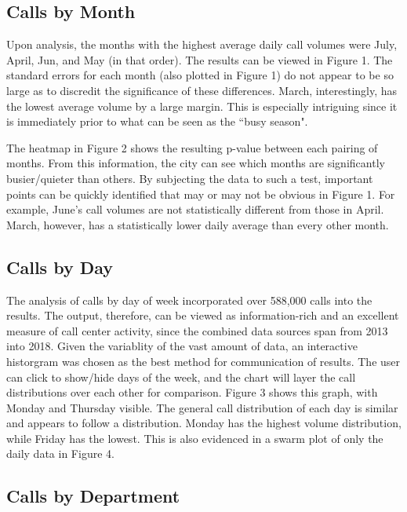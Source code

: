\documentclass{article}
\begin{document}
	\subsection{Calls by Month}

Upon analysis, the months with the highest average daily call volumes were July, April, Jun, and May (in that order).  The results can be viewed in Figure 1.  The standard errors for each month (also plotted in Figure 1) do not appear to be so large as to discredit the significance of these differences.  March, interestingly, has the lowest average volume by a large margin.  This is especially intriguing since it is immediately prior to what can be seen as the ``busy season".

The heatmap in Figure 2 shows the resulting p-value between each pairing of months.  From this information, the city can see which months are significantly busier/quieter than others.  By subjecting the data to such a test, important points can be quickly identified that may or may not be obvious in Figure 1.  For example, June's call volumes are not statistically different from those in April.  March, however, has a statistically lower daily average than every other month.


	\subsection{Calls by Day}

The analysis of calls by day of week incorporated over 588,000 calls into the results.  The output, therefore, can be viewed as information-rich and an excellent measure of call center activity, since the combined data sources span from 2013 into 2018.  Given the variablity of the vast amount of data, an interactive historgram was chosen as the best method for communication of results.  The user can click to show/hide days of the week, and the chart will layer the call distributions over each other for comparison.  Figure 3 shows this graph, with Monday and Thursday visible.  The general call distribution of each day is similar and appears to follow a 
distribution.  Monday has the highest volume distribution, while Friday has the lowest.  This is also evidenced in a swarm plot of only the daily data in Figure 4.


	\subsection{Calls by Department}
\end{document}
